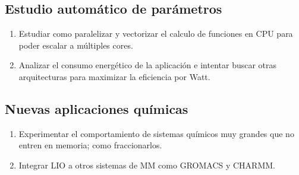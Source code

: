 \subsection*{Estudio autom\'atico de par\'ametros}
\begin{enumerate}
  \item Estudiar como paralelizar y vectorizar el calculo de funciones en CPU para poder escalar a m\'ultiples cores.
  \item Analizar el consumo energ\'etico de la aplicaci\'on e intentar buscar otras arquitecturas para maximizar
    la eficiencia por Watt.
\end{enumerate}

\subsection*{Nuevas aplicaciones qu\'imicas}
\begin{enumerate}
  \item Experimentar el comportamiento de sistemas qu\'imicos muy grandes que no entren en memoria; como fraccionarlos.
  \item Integrar LIO a otros sistemas de MM como GROMACS y CHARMM.
\end{enumerate}
